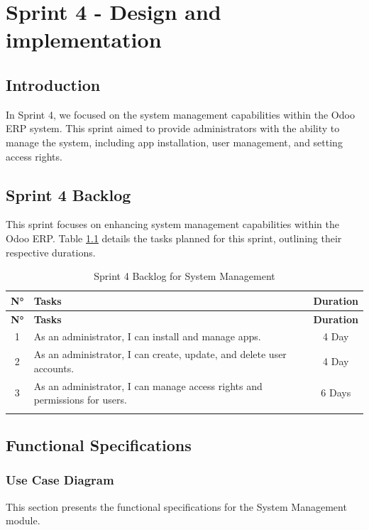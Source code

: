 \chapter{Sprint 4 - Design and implementation}

\section*{Introduction}


In Sprint 4, we focused on the system management capabilities within the Odoo ERP system. This sprint aimed to provide administrators with the ability to manage the system, including app installation, user management, and setting access rights.

\section{Sprint 4 Backlog}
This sprint focuses on enhancing system management capabilities within the Odoo ERP. Table \ref{tab:sprint4_backlog} details the tasks planned for this sprint, outlining their respective durations.
\begin{longtable}{|c|p{8cm}|c|}
    \hline
    \rowcolor{purple!20} \textbf{N°} & \textbf{Tasks} & \textbf{Duration} \\ \hline
    \endfirsthead
    \hline
    \rowcolor{purple!20} \textbf{N°} & \textbf{Tasks} & \textbf{Duration} \\ \hline
    \endhead
    1 & As an administrator, I can install and manage apps. & 4 Day \\ \hline
    2 & As an administrator, I can create, update, and delete user accounts. & 4 Day \\ \hline
    3 & As an administrator, I can manage access rights and permissions for users. & 6 Days \\ \hline
    \caption{Sprint 4 Backlog for System Management}
    \label{tab:sprint4_backlog}
\end{longtable}

\section{Functional Specifications}

\subsection{Use Case Diagram}
This section presents the functional specifications for the System Management module.


